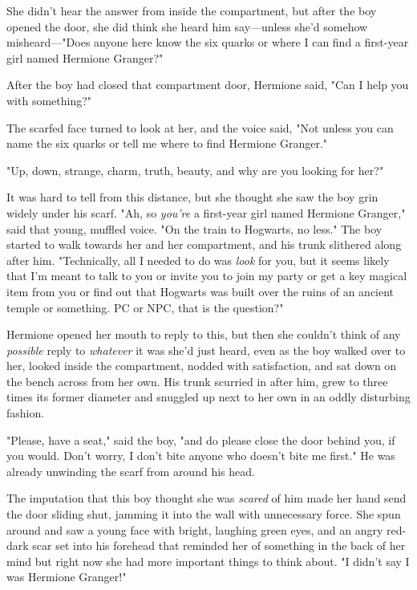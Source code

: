 She didn't hear the answer from inside the compartment, but after the boy
opened the door, she did think she heard him say---unless she'd somehow
misheard\mbox{---}"Does anyone here know the six quarks or where I can find a
first-year girl named Hermione Granger?"

After the boy had closed that compartment door, Hermione said, "Can I help you
with something?"

The scarfed face turned to look at her, and the voice said, "Not unless you can
name the six quarks or tell me where to find Hermione Granger."

"Up, down, strange, charm, truth, beauty, and why are you looking for her?"

It was hard to tell from this distance, but she thought she saw the boy grin
widely under his scarf. "Ah, so \emph{you're} a first-year girl named Hermione
Granger," said that young, muffled voice. "On the train to Hogwarts, no less."
The boy started to walk towards her and her compartment, and his trunk
slithered along after him. "Technically, all I needed to do was \emph{look} for
you, but it seems likely that I'm meant to talk to you or invite you to join my
party or get a key magical item from you or find out that Hogwarts was built
over the ruins of an ancient temple or something. PC or NPC, that is the
question?"

Hermione opened her mouth to reply to this, but then she couldn't think of any
\emph{possible} reply to{\el} \emph{whatever} it was she'd just heard, even
as the boy walked over to her, looked inside the compartment, nodded with
satisfaction, and sat down on the bench across from her own. His trunk scurried
in after him, grew to three times its former diameter and snuggled up next to
her own in an oddly disturbing fashion.

"Please, have a seat," said the boy, "and do please close the door behind you,
if you would. Don't worry, I don't bite anyone who doesn't bite me first." He
was already unwinding the scarf from around his head.

The imputation that this boy thought she was \emph{scared} of him made her hand
send the door sliding shut, jamming it into the wall with unnecessary force.
She spun around and saw a young face with bright, laughing green eyes, and an
angry red-dark scar set into his forehead that reminded her of something in the
back of her mind but right now she had more important things to think about. "I
didn't say I was Hermione Granger!"

